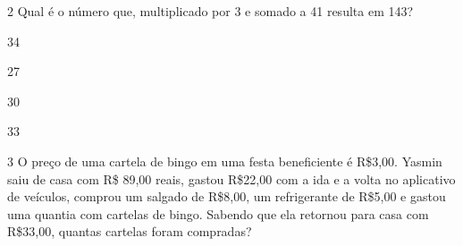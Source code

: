 

\num{2} Qual é o número que, multiplicado por 3 e somado a 41 resulta em 143?


\begin{escolha}[itemsep=0pt]
\item 34
\item 27
\item 30
\item 33
\end{escolha}




\num{3} O preço de uma cartela de bingo em uma festa beneficiente é
R\$3,00. Yasmin saiu de casa com R\$ 89,00 reais, gastou R\$22,00 com a
ida e a volta no aplicativo de veículos, comprou um salgado de R\$8,00,
um refrigerante de R\$5,00 e gastou uma quantia com cartelas de bingo.
Sabendo que ela retornou para casa com R\$33,00, quantas cartelas foram
compradas?


